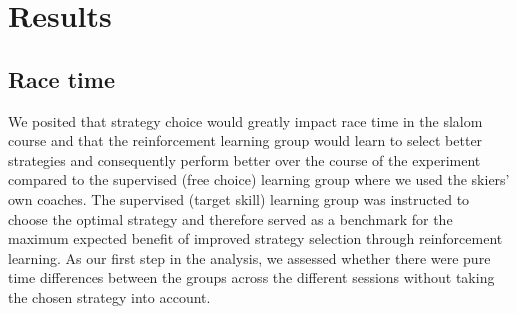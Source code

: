 \documentclass[pdflatex,sn-nature]{sn-jnl}%
\theoremstyle{thmstyleone}%
\theoremstyle{thmstyletwo}%
\theoremstyle{thmstylethree}%
\begin{document}
\section{Results}

\subsection{Race time}\label{result_racetime}
We posited that strategy choice would greatly impact race time in the slalom course and that the reinforcement learning group would learn to select better strategies and consequently perform better over the course of the experiment compared to the supervised (free choice) learning group where we used the skiers' own coaches. The supervised (target skill) learning group was instructed to choose the optimal strategy and therefore served as a benchmark for the maximum expected benefit of improved strategy selection through reinforcement learning. As our first step in the analysis, we assessed whether there were pure time differences between the groups across the different sessions without taking the chosen strategy into account. 
\end{document}
